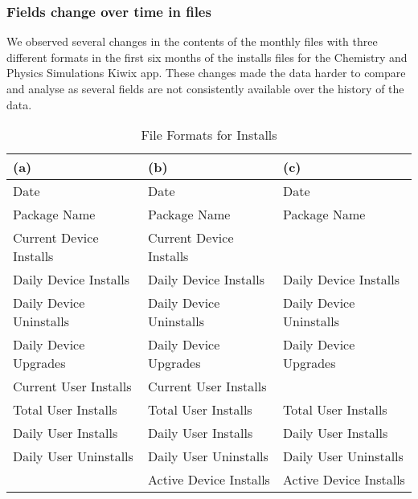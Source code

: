 \subsubsection{Fields change over time in files}
We observed several changes in the contents of the monthly files with three different formats in the first six months of the installs files for the Chemistry and Physics Simulations Kiwix app. These changes made the data harder to compare and analyse as several fields are not consistently available over the history of the data.
\begin{table}[ht]
    \centering
    \footnotesize
    \begin{tabular}{lll}
    (a) &(b) &(c)\\
    \hline
    Date &Date &Date\\
    Package Name &Package Name &Package Name\\
    Current Device Installs &Current Device Installs &\\
    Daily Device Installs &Daily Device Installs &Daily Device Installs\\
    Daily Device Uninstalls &Daily Device Uninstalls &Daily Device Uninstalls\\
    Daily Device Upgrades &Daily Device Upgrades &Daily Device Upgrades\\
    Current User Installs &Current User Installs &\\
    Total User Installs &Total User Installs &Total User Installs\\
    Daily User Installs &Daily User Installs &Daily User Installs\\
    Daily User Uninstalls &Daily User Uninstalls &Daily User Uninstalls\\
                          &Active Device Installs &Active Device Installs\\
    \end{tabular}
    \caption{File Formats for Installs}
    \label{tab:file_formats_for_installs}
\end{table}

